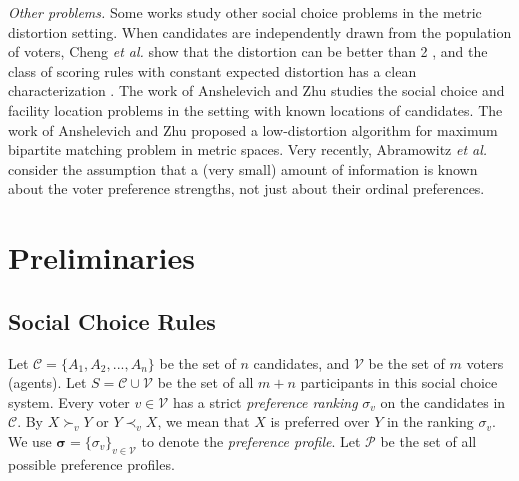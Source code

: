 \documentclass[11pt]{article}
\theoremstyle{remark}
\begin{document}



\emph{Other problems.} Some works study other social choice problems in the metric distortion setting. When candidates are independently drawn from the population of voters, Cheng \emph{et al.} show that the distortion can be better than 2 \cite{cheng2017people}, and  the class of scoring rules with constant expected distortion has a clean characterization \cite{cheng2018distortion}. The work of Anshelevich and Zhu \cite{anshelevich2018ordinal} studies the social choice and facility location problems in the setting with known locations of candidates. The work of Anshelevich and Zhu \cite{anshelevich2019tradeoffs} proposed a low-distortion algorithm for maximum bipartite matching problem in metric spaces. Very recently, Abramowitz \emph{et al.} \cite{abramowitz2019awareness} consider the assumption that a (very small) amount of information is known about the voter preference strengths, not just about their ordinal preferences.


\section{Preliminaries}\label{sec:pre}

\subsection{Social Choice Rules}
Let $\mathcal C = \{A_1,A_2,...,A_n\}$ be the set of $n$ candidates, and $\mathcal V$ be the set of $m$ voters (agents). Let $S=\mathcal C \cup \mathcal V $ be the set of all $m+n$ participants in this social choice system. %
 Every voter $v\in \mathcal V $ has a strict \emph{preference ranking} $\sigma_v$ on the candidates in $\mathcal C$. By $X\succ_v Y$ or $Y\prec_v X$, we mean that $X$ is preferred over $Y$ in the ranking $\sigma_v$. We use $\bm{\sigma}= \{\sigma_v\}_{v\in \mathcal V }$ to denote the \emph{preference profile}.  Let $\mathcal P$ be the set of all possible preference profiles.
\end{document}
